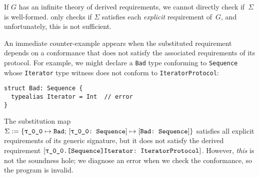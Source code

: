\documentclass[../generics]{subfiles}
\begin{document}
If $G$ has an infinite theory of derived requirements, we cannot directly check if~$\Sigma$ is well-formed.  only checks if $\Sigma$ satisfies each \emph{explicit} requirement of~$G$, and unfortunately, this is not sufficient.

An immediate counter-example appears when the substituted requirement depends on a conformance that does not satisfy the associated requirements of its protocol. For example, we might declare a \texttt{Bad} type conforming to \texttt{Sequence} whose \texttt{Iterator} type witness does not conform to \texttt{IteratorProtocol}:
\begin{Verbatim}
struct Bad: Sequence {
  typealias Iterator = Int  // error
}
\end{Verbatim}
The substitution map
$\Sigma:=\SubstMapC{\SubstType{\rT}{Bad}}{\SubstConf{\rT}{Bad}{Sequence}}$ satisfies all explicit requirements of its generic signature, but it does not satisfy the derived requirement $\ConfReq{\rT.[Sequence]Iterator}{IteratorProtocol}$. However, \emph{this} is not the soundness hole; we diagnose an error when we check the conformance, so the program is invalid.
\end{document}
